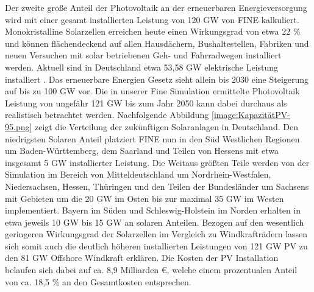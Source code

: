 
Der zweite große Anteil der Photovoltaik an der erneuerbaren Energieversorgung wird mit einer gesamt installierten Leistung von 120 GW von FINE kalkuliert. Monokristalline Solarzellen erreichen heute einen Wirkungsgrad von etwa 22 \%   und können flächendeckend auf allen Hausdächern, Bushaltestellen, Fabriken und neuen Versuchen mit solar betriebenen Geh- und Fahrradwegen installiert werden. Aktuell sind in Deutschland etwa 53,58 GW elektrische Leistung installiert  . Das erneuerbare Energien Gesetz sieht allein bis 2030 eine Steigerung auf bis zu 100 GW vor.  Die in unserer Fine Simulation ermittelte Photovoltaik Leistung von ungefähr 121 GW bis zum Jahr 2050 kann dabei durchaus als realistisch betrachtet werden. Nachfolgende Abbildung \ref{image:KapazitätPV-95.png} zeigt die Verteilung der zukünftigen Solaranlagen in Deutschland. Den niedrigsten Solaren Anteil platziert FINE nun in den Süd Westlichen Regionen um Baden-Württemberg, dem Saarland und Teilen von Hessens mit etwa insgesamt 5 GW installierter Leistung. Die Weitaus größten Teile werden von der Simulation im Bereich von Mitteldeutschland um Nordrhein-Westfalen, Niedersachsen, Hessen, Thüringen und den Teilen der Bundesländer um Sachsens mit Gebieten um die 20 GW im Osten bis zur maximal 35 GW im Westen implementiert. Bayern im Süden und Schleswig-Holstein im Norden erhalten in etwa jeweils 10 GW bis 15 GW an solaren Anteilen. Bezogen auf den wesentlich geringeren Wirkungsgrad der Solarzellen im Vergleich zu Windkrafträdern lassen sich somit auch die deutlich höheren installierten Leistungen von 121 GW PV zu den 81 GW Offshore Windkraft erklären. Die Kosten der PV Installation belaufen sich dabei auf ca. 8,9 Milliarden €, welche einem prozentualen Anteil von ca. 18,5  \% an den Gesamtkosten entsprechen.



